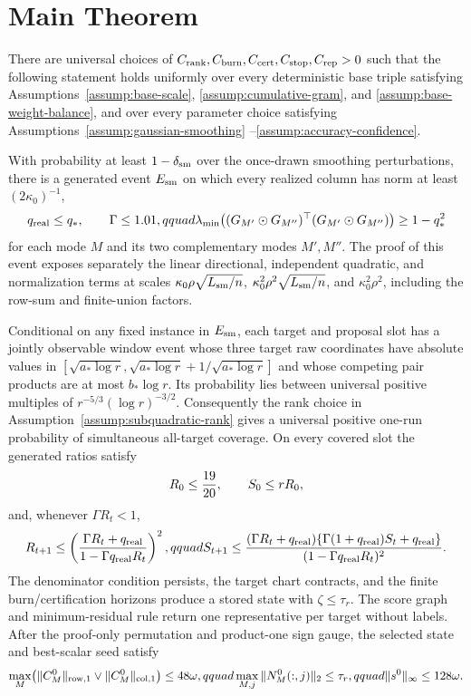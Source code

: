\section{Main Theorem}\label{sec:main}

\begin{theorem}
\label{thm:main}
There are universal choices of
$C_{\rm rank},C_{\rm burn},C_{\rm cert},C_{\rm stop},C_{\rm rep}>0$ such
that the following statement holds uniformly over every deterministic base
triple satisfying Assumptions~\ref{assump:base-scale},
\ref{assump:cumulative-gram}, and \ref{assump:base-weight-balance}, and
over every parameter choice satisfying Assumptions~\ref{assump:gaussian-smoothing}
--\ref{assump:accuracy-confidence}.

With probability at least $1-\delta_{\rm sm}$ over the once-drawn smoothing
perturbations, there is a generated event $E_{\rm sm}$ on which every realized
column has norm at least $(2\kappa _0)^{-1}$,
\[
 q_{\rm real}\le q_*,\qquad \Gamma\le1.01,qquad
 \lambda_{\min}\bigl((G_{M'}\odot G_{M''})^\top
 (G_{M'}\odot G_{M''})\bigr)\ge1-q_*^2
\]
for each mode $M$ and its two complementary modes $M',M''$.  The proof of
this event exposes separately the linear directional, independent quadratic,
and normalization terms at scales
$\kappa _0\rho\sqrt{L_{\rm sm}/n}$,
$\kappa _0^2\rho^2\sqrt{L_{\rm sm}/n}$, and
$\kappa _0^2\rho^2$, including the row-sum and finite-union factors.

Conditional on any fixed instance in $E_{\rm sm}$, each target and proposal
slot has a jointly observable window event whose three target raw
coordinates have absolute values in
$[\sqrt{a_*\log r},\sqrt{a_*\log r}+1/\sqrt{a_*\log r}]$ and whose
competing pair products are at most $b_*\log r$.  Its probability lies
between universal positive multiples of
$r^{-5/3}(\log r)^{-3/2}$.  Consequently the rank choice in
Assumption~\ref{assump:subquadratic-rank} gives a universal positive
one-run probability of simultaneous all-target coverage.  On every covered
slot the generated ratios satisfy
\[
 R_0\le {19\over20},\qquad S_0\le rR_0,
\]
and, whenever $\Gamma R_t<1$,
\[
 R_{t+1}\le\left({\Gamma R_t+q_{\rm real}\over
 1-\Gamma q_{\rm real}R_t}\right)^2,qquad
 S_{t+1}\le { (\Gamma R_t+q_{\rm real})
 \{\Gamma(1+q_{\rm real})S_t+q_{\rm real}\}\over
 (1-\Gamma q_{\rm real}R_t)^2}.
\]
The denominator condition persists, the target chart contracts, and the
finite burn/certification horizons produce a stored state with
$\zeta\le\tau_r$.  The score graph and minimum-residual rule return one
representative per target without labels.  After the proof-only permutation
and product-one sign gauge, the selected state and best-scalar seed satisfy
\[
 \max_M\bigl(\|C_M^0\|_{\rm row,1}\vee
 \|C_M^0\|_{\rm col,1}\bigr)\le48\omega,qquad
 \max_{M,j}\|N_M^0(:,j)\|_2\le\tau_r,qquad
 \|s^0\|_\infty\le128\omega.
\]


\end{theorem}
